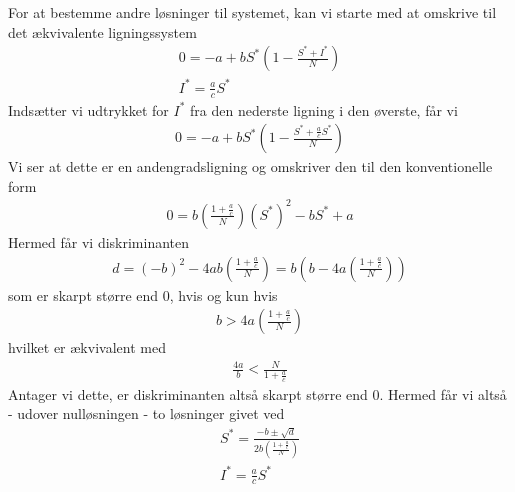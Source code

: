 \documentclass[12pt]{article}
\begin{document}
For at bestemme andre løsninger til systemet, kan vi starte med at omskrive til det ækvivalente ligningssystem
\begin{align}
0 = -a + bS^*\left(1 - \frac{S^* + I^*}{N} \right)\\
I^* = \frac{a}{c}S^*
\end{align}
Indsætter vi udtrykket for $I^*$ fra den nederste ligning i den øverste, får vi
\begin{align}
0 = -a + bS^*\left(1 - \frac{S^* + \frac{a}{c}S^*}{N} \right)
\end{align}
Vi ser at dette er en andengradsligning og omskriver den til den konventionelle form
\begin{align}
0 = b\left(\frac{1 + \frac{a}{c}}{N} \right)(S^*)^2  - bS^* + a 
\end{align}
Hermed får vi diskriminanten
\begin{align}
d = (-b)^2 - 4 ab\left(\frac{1 + \frac{a}{c}}{N} \right) = b\left(b - 4a \left( \frac{1 + \frac{a}{c}}{N} \right) \right)
\end{align}
som er skarpt større end 0, hvis og kun hvis
\begin{align}
b > 4a \left( \frac{1 + \frac{a}{c}}{N} \right)
\end{align}
hvilket er ækvivalent med 
\begin{align}
\frac{4a}{b} < \frac{N}{1 + \frac{a}{c}} 
\end{align}
Antager vi dette, er diskriminanten altså skarpt større end 0. Hermed får vi altså - udover nulløsningen - to løsninger givet ved
\begin{align}
S^* = \frac{-b \pm \sqrt{d}}{2b\left(\frac{1 + \frac{a}{c}}{N} \right)}\\
I^* = \frac{a}{c}S^*
\end{align}
\end{document}
